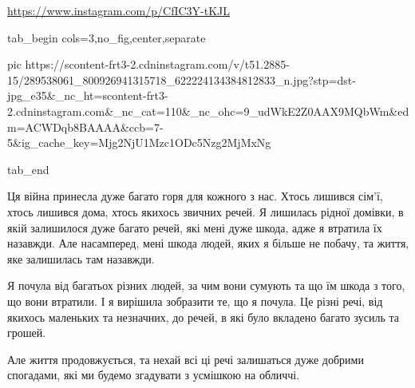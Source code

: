  
 
 
 
 

\url{https://www.instagram.com/p/CfIC3Y-tKJL}

\ifcmt
  tab_begin cols=3,no_fig,center,separate

     pic https://scontent-frt3-2.cdninstagram.com/v/t51.2885-15/289538061_800926941315718_622224134384812833_n.jpg?stp=dst-jpg_e35&_nc_ht=scontent-frt3-2.cdninstagram.com&_nc_cat=110&_nc_ohc=9_udWkE2Z0AAX9MQbWm&edm=ACWDqb8BAAAA&ccb=7-5&ig_cache_key=Mjg2NjU1Mzc1ODc5Nzg2MjMxNg%

  tab_end
\fi

Ця війна принесла дуже багато горя для кожного з нас. Хтось лишився сім’ї,
хтось лишився дома, хтось якихось звичних речей. Я лишилась рідної домівки, в
якій залишилося дуже багато речей, які мені дуже шкода, адже я втратила їх
назавжди. Але насамперед, мені шкода людей, яких я більше не побачу, та життя,
яке залишилась там назавжди.

Я почула від багатьох різних людей, за чим вони сумують та що їм шкода з того,
що вони втратили. І я вирішила зобразити те, що я почула. Це різні речі, від
якихось маленьких та незначних, до речей, в які було вкладено багато зусиль та
грошей.

Але життя продовжується, та нехай всі ці речі залишаться дуже добрими
спогадами, які ми будемо згадувати з усмішкою на обличчі.
